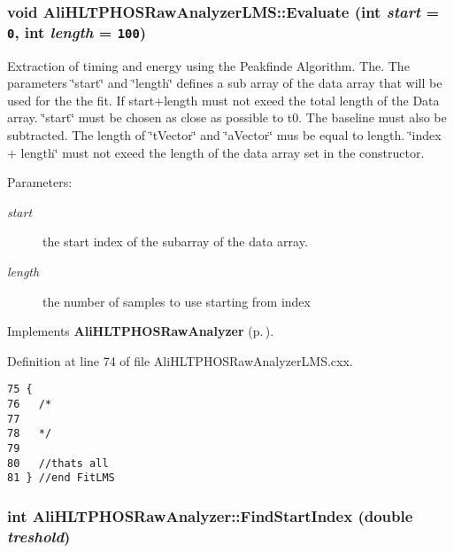 \subsubsection{\setlength{\rightskip}{0pt plus 5cm}void Ali\-HLTPHOSRaw\-Analyzer\-LMS::Evaluate (int {\em start} = {\tt 0}, int {\em length} = {\tt 100})\hspace{0.3cm}{\tt  [virtual]}}\label{classAliHLTPHOSRawAnalyzerLMS_AliHLTPHOSRawAnalyzerLMSa5}


Extraction of timing and energy using the Peakfinde Algorithm. The. The parameters \char`\"{}start\char`\"{} and \char`\"{}length\char`\"{} defines a sub array of the data array that will be used for the the fit. If start+length must not exeed the total length of the Data array. \char`\"{}start\char`\"{} must be chosen as close as possible to t0. The baseline must also be subtracted. The length of \char`\"{}t\-Vector\char`\"{} and \char`\"{}a\-Vector\char`\"{} mus be equal to length. \char`\"{}index + length\char`\"{} must not exeed the length of the data array set in the constructor. \begin{Desc}
\item[Parameters:]
\begin{description}
\item[{\em start}]the start index of the subarray of the data array. \item[{\em length}]the number of samples to use starting from index \end{description}
\end{Desc}


Implements {\bf Ali\-HLTPHOSRaw\-Analyzer} {\rm (p.\,\pageref{classAliHLTPHOSRawAnalyzer_AliHLTPHOSRawAnalyzerPeakFindera17})}.

Definition at line 74 of file Ali\-HLTPHOSRaw\-Analyzer\-LMS.cxx.

\footnotesize\begin{verbatim}75 {
76   /*
77 
78   */
79 
80   //thats all 
81 } //end FitLMS
\end{verbatim}\normalsize 


\subsubsection{\setlength{\rightskip}{0pt plus 5cm}int Ali\-HLTPHOSRaw\-Analyzer::Find\-Start\-Index (double {\em treshold})\hspace{0.3cm}{\tt  [inherited]}}\label{classAliHLTPHOSRawAnalyzer_AliHLTPHOSRawAnalyzerPeakFindera9}




